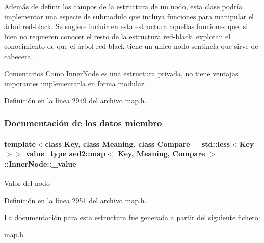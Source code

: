 Además de definir los campos de la estructura de un nodo, esta clase podría implementar una especie de submodulo que incluya funciones para manipular el árbol red-\/black. Se sugiere incluir en esta estructura aquellas funciones que, si bien no requieren conocer el resto de la estructura red-\/black, explotan el conocimiento de que el árbol red-\/black tiene un unico nodo sentinela que sirve de cabecera.

\begin{DoxyRemark}{Comentarios}
Como \hyperlink{structaed2_1_1map_1_1InnerNode}{Inner\-Node} es una estructura privada, no tiene ventajas imporantes implementarla en forma modular. 
\end{DoxyRemark}


Definición en la línea \hyperlink{map_8h_source_l02949}{2949} del archivo \hyperlink{map_8h_source}{map.\-h}.



\subsubsection{Documentación de los datos miembro}
\hypertarget{structaed2_1_1map_1_1InnerNode_a53fd8a50986fec67601dd77c44c1657e_a53fd8a50986fec67601dd77c44c1657e}{
\paragraph[{\-\_\-value}]{\setlength{\rightskip}{0pt plus 5cm}template$<$class Key, class Meaning, class Compare = std\-::less$<$\-Key$>$$>$ {\bf value\-\_\-type} {\bf aed2\-::map}$<$ Key, Meaning, Compare $>$\-::Inner\-Node\-::\-\_\-value}}\label{structaed2_1_1map_1_1InnerNode_a53fd8a50986fec67601dd77c44c1657e_a53fd8a50986fec67601dd77c44c1657e}
Valor del nodo 

Definición en la línea \hyperlink{map_8h_source_l02951}{2951} del archivo \hyperlink{map_8h_source}{map.\-h}.



La documentación para esta estructura fue generada a partir del siguiente fichero\-:\begin{DoxyCompactItemize}
\item 
\hyperlink{map_8h}{map.\-h}\end{DoxyCompactItemize}
